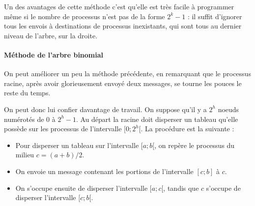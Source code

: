 Un des avantages de cette méthode c'est qu'elle est très facile à programmer
même si le nombre de processus n'est pas de la forme $2^k - 1$ : il suffit
d'ignorer tous les envois à destinations de processus inexistants, qui sont tous
au dernier niveau de l'arbre, sur la droite.

\paragraph{Méthode de l'arbre binomial} On peut améliorer un peu la
méthode précédente, en remarquant que le processus racine, après avoir
glorieusement envoyé deux messages, se tourne les pouces le reste du
temps.

On peut donc lui confier davantage de travail. On suppose qu'il y a
$2^h$ noeuds numérotés de $0$ à $2^h - 1$. Au départ la racine doit
disperser un tableau qu'elle possède sur les processus de l'intervalle
$[0; 2^h[$. La procédure est la suivante :
\begin{itemize}
\item Pour disperser un tableau sur l'intervalle $[a; b[$, on repère
  le processus du milieu $c = (a+b)/2$.
\item On envoie un message contenant les portions de l'intervalle
  $[c;b]$ à $c$.
\item On s'occupe ensuite de disperser l'intervalle $[a; c[$, tandis
  que $c$ s'occupe de disperser l'intervalle $[c;b[$.
\end{itemize}

\begin{center}
\end{center}


